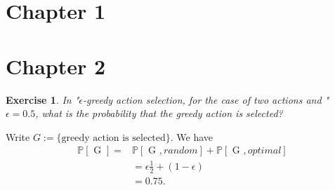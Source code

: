 \documentclass[answers]{exam}
\newtheorem{exercise}[theorem]{Exercise}
\theoremstyle{definition}
\theoremstyle{remark}
\newcommand{\Proba}[1]{\mathbb{P}\left[#1\right]}
\begin{document}
\section{Chapter 1}

\section{Chapter 2}


\begin{exercise}
In "$\epsilon$-greedy action selection, for the case of two actions and " $\epsilon= 0.5$, what is
the probability that the greedy action is selected?
\end{exercise}
\begin{solution}
Write $G:=\{\text{greedy action is selected}\}$. We have
\begin{align*}
\Proba{\text{ G }}=&\Proba{\text{ G },random}+\Proba{\text{ G },optimal}    \\
&=\epsilon\frac{1}{2}+(1-\epsilon)\\
&=0.75.
\end{align*}  
\end{solution}
\end{document}
